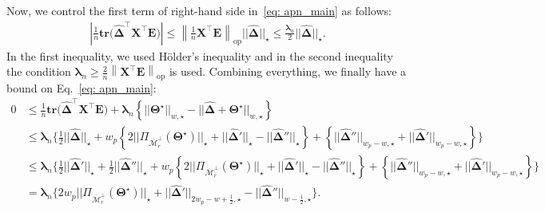 \documentclass[alpha-refs]{wiley-article}
\begin{document}
Now, we control the first term of right-hand side in~\eqref{eq: apn_main} as follows:
\begin{align} 
    \left| \frac{1}{n} \textbf{tr}\big( \boldsymbol{\widehat{\Delta}}^{\top} \boldsymbol{X}^{\top}\boldsymbol{E} \big) \right| 
    \leq \left\|\frac{1}{n} \boldsymbol{X}^{\top}\boldsymbol{E} \right\|_{\text{op}} ||\boldsymbol{\widehat{\Delta}}||_{\star}
    \leq \frac{\boldsymbol{\lambda}_{n}}{2} ||\boldsymbol{\widehat{\Delta}}||_{\star}.
    \label{holder_ineq}
\end{align}
In the first inequality, we used H\"older's inequality and in the second inequality 
the condition $\boldsymbol{\lambda}_{n}\geq\frac{2}{n}\left\|\boldsymbol{X}^{\top}\boldsymbol{E} \right\|_{\text{op}}$ is used.
Combining everything, we finally have a bound on Eq.~\eqref{eq: apn_main}:
\begin{align}
    0  & \leq \frac{1}{n} \textbf{tr}\big( \boldsymbol{\widehat{\Delta}}^{\top} \boldsymbol{X}^{\top}\boldsymbol{E} \big)
    + \boldsymbol{\lambda}_{n}\left\lbrace||\boldsymbol{\Theta^{\star}}||_{w, \star} - ||\boldsymbol{\widehat{\Delta}} + \boldsymbol{\Theta^{\star}}||_{w, \star}\right\rbrace \nonumber\\
    & \leq \boldsymbol{\lambda}_{n} \Bigg\{ \frac{1}{2}||\boldsymbol{\widehat{\Delta}}||_{\star} + w_{p}\left\lbrace 2||\Pi_{\overline{\mathcal{M}}_{r}^{\perp}}(\boldsymbol{\Theta^{\star}})||_{\star} + ||\boldsymbol{\widehat{\Delta}}'||_{\star} - ||\boldsymbol{\widehat{\Delta}}''||_{\star}  \right\rbrace + \left\lbrace ||\boldsymbol{\widehat{\Delta}}''||_{w_{p} - w, \star}  + ||\boldsymbol{\widehat{\Delta}}'||_{w_{p} - w, \star}\right\rbrace \Bigg\} \nonumber\\
    & \leq \boldsymbol{\lambda}_{n} \Bigg\{ \frac{1}{2}||\boldsymbol{\widehat{\Delta}}'||_{\star} + \frac{1}{2}||\boldsymbol{\widehat{\Delta}}''||_{\star} + w_{p}\left\lbrace 2||\Pi_{\overline{\mathcal{M}}_{r}^{\perp}}(\boldsymbol{\Theta^{\star}})||_{\star} + ||\boldsymbol{\widehat{\Delta}}'||_{\star} - ||\boldsymbol{\widehat{\Delta}}''||_{\star}  \right\rbrace 
    + \left\lbrace ||\boldsymbol{\widehat{\Delta}}''||_{w_{p} - w, \star}  + ||\boldsymbol{\widehat{\Delta}}'||_{w_{p} - w, \star}\right\rbrace \Bigg\} \nonumber\\
    &= \boldsymbol{\lambda}_{n} \Bigg\{ 2w_{p}||\Pi_{\overline{\mathcal{M}}_{r}^{\perp}}(\boldsymbol{\Theta^{\star}})||_{\star} +  ||\boldsymbol{\widehat{\Delta}}'||_{2w_{p}-w+\frac{1}{2}, \star} - ||\boldsymbol{\widehat{\Delta}}''||_{w - \frac{1}{2},\star} \Bigg\}. \label{eq: pre_new_main}
\end{align}
\end{document}
